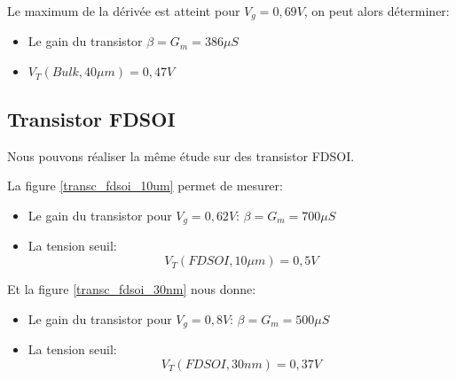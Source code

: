\documentclass[a4paper,11pt]{report}
\begin{document}
Le maximum de la dérivée est atteint pour $V_g = 0,69V$, on peut alors déterminer:
\begin{itemize}
    \item Le gain du transistor $\beta = G_m = 386\mu S$
    \item $V_T(Bulk, 40\mu m) = 0,47V$
\end{itemize}


\subsection{Transistor FDSOI}
Nous pouvons réaliser la même étude sur des transistor FDSOI.

La figure \ref{transc_fdsoi_10um} permet de mesurer:

\begin{itemize}
    \item Le gain du transistor pour $V_g = 0,62V$: $\beta = G_m = 700\mu S$
    \item La tension seuil: \[V_T(FDSOI, 10\mu m) = 0,5V\]
\end{itemize}

\vspace*{8mm}
Et la figure \ref{transc_fdsoi_30nm} nous donne:
\begin{itemize}
    \item Le gain du transistor pour $V_g = 0,8V$: $\beta = G_m = 500\mu S$
    \item La tension seuil: \[V_T(FDSOI, 30nm) = 0,37V\]
\end{itemize}
\end{document}
